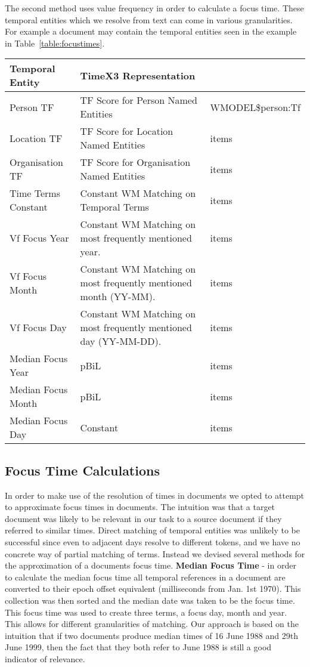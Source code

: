 \documentclass{mpaper}
\begin{document}
The second method uses value frequency in order to calculate a focus time. These temporal entities which we resolve from text can come in various granularities. For example a document may contain the temporal entities seen in the example in Table~\ref{table:focustimes}.

\begin{table*}[t] \label{table:focustimes}
\centering
\begin{tabular}{|p{4cm}|p{6cm}|p{4cm}|}
\hline
Temporal Entity 	& TimeX3 Representation  \\ \hline
Person TF 			& TF Score for Person Named Entities 		& WMODEL\$person:Tf  \\ \hline
Location TF 		& TF Score for Location Named Entities 		& items  \\ \hline
Organisation TF 	& TF Score for Organisation Named Entities 		& items  \\ \hline
Time Terms Constant & Constant WM Matching on Temporal Terms			& items  \\ \hline
Vf Focus Year 		& Constant WM Matching on most frequently mentioned year. 		& items  \\ \hline
Vf Focus Month 		& Constant WM Matching on most frequently mentioned month (YY-MM).  		& items  \\ \hline
Vf Focus Day 		& Constant WM Matching on most frequently mentioned day (YY-MM-DD).  		& items  \\ \hline
Median Focus Year 	& pBiL 		& items  \\ \hline
Median Focus Month 	& pBiL 		& items  \\ \hline
Median Focus Day 	& Constant 		& items  \\ \hline
\end{tabular}
\end{table*}


\subsection{Focus Time Calculations}
In order to make use of the resolution of times in documents we opted to attempt to approximate focus times in documents. The intuition was that a target document was likely to be relevant in our task to a source document if they referred to similar times.
Direct matching of temporal entities was unlikely to be successful since even to adjacent days resolve to different tokens, and we have no concrete way of partial matching of terms.
Instead we devised several methods for the approximation of a documents focus time.
\textbf{Median Focus Time} - in order to calculate the median focus time all temporal references in a document are converted to their epoch offset equivalent (milliseconds from Jan. 1st 1970).
This collection was then sorted and the median date was taken to be the focus time.
This focus time was used to create three terms, a focus day, month and year. This allows for different granularities of matching.
Our approach is based on the intuition that if two documents produce median times of 16 June 1988 and 29th June 1999, then the fact that they both refer to June 1988 is still a good indicator of relevance.
\end{document}
